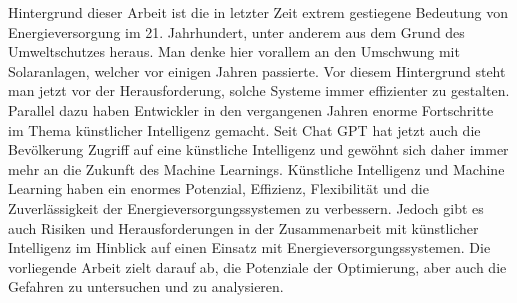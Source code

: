 Hintergrund dieser Arbeit ist die in letzter Zeit extrem gestiegene Bedeutung von Energieversorgung im 21. Jahrhundert, unter anderem aus dem Grund des Umweltschutzes heraus.
Man denke hier vorallem an den Umschwung mit Solaranlagen, welcher vor einigen Jahren passierte.
Vor diesem Hintergrund steht man jetzt vor der Herausforderung, solche Systeme immer effizienter zu gestalten.
Parallel dazu haben Entwickler in den vergangenen Jahren enorme Fortschritte im Thema künstlicher Intelligenz gemacht.
Seit Chat GPT hat jetzt auch die Bevölkerung Zugriff auf eine künstliche Intelligenz und gewöhnt sich daher immer mehr an die Zukunft des Machine Learnings.
Künstliche Intelligenz und Machine Learning haben ein enormes Potenzial, Effizienz, Flexibilität und die Zuverlässigkeit der Energieversorgungssystemen zu verbessern.
Jedoch gibt es auch Risiken und Herausforderungen in der Zusammenarbeit mit künstlicher Intelligenz im Hinblick auf einen Einsatz mit Energieversorgungssystemen.
Die vorliegende Arbeit zielt darauf ab, die Potenziale der Optimierung, aber auch die Gefahren zu untersuchen und zu analysieren.
